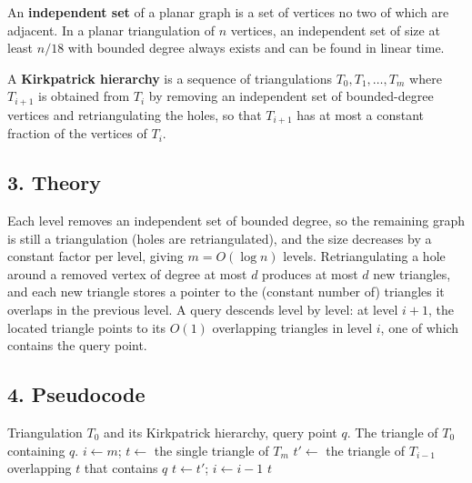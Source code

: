 \begin{definition}\label{def:pointloc_independent}
  An \textbf{independent set} of a planar graph is a set of vertices no two
  of which are adjacent. In a planar triangulation of $n$ vertices, an
  independent set of size at least $n/18$ with bounded degree always exists
  and can be found in linear time.
\end{definition}

\begin{definition}\label{def:pointloc_kh}
  A \textbf{Kirkpatrick hierarchy} is a sequence of triangulations
  $T_0, T_1, \dots, T_m$ where $T_{i+1}$ is obtained from $T_i$ by removing
  an independent set of bounded-degree vertices and retriangulating the
  holes, so that $T_{i+1}$ has at most a constant fraction of the vertices
  of $T_i$.
\end{definition}

\subsection{3. Theory}

Each level removes an independent set of bounded degree, so the remaining
graph is still a triangulation (holes are retriangulated), and the size
decreases by a constant factor per level, giving $m = O(\log n)$ levels.
Retriangulating a hole around a removed vertex of degree at most $d$
produces at most $d$ new triangles, and each new triangle stores a pointer
to the (constant number of) triangles it overlaps in the previous level.
A query descends level by level: at level $i+1$, the located triangle points
to its $O(1)$ overlapping triangles in level $i$, one of which contains the
query point.

\subsection{4. Pseudocode}

\begin{algorithm}[htbp]
\caption{Kirkpatrick Point Location}
\label{alg:pointloc_kirkpatrick}
\begin{algorithmic}[1]
\Require Triangulation $T_0$ and its Kirkpatrick hierarchy, query point $q$.
\Ensure The triangle of $T_0$ containing $q$.
  \State $i \gets m$; $t \gets$ the single triangle of $T_m$
    \State $t' \gets$ the triangle of $T_{i-1}$ overlapping $t$ that contains $q$
    \State $t \gets t'$; $i \gets i - 1$
  \EndWhile
  \State \Return $t$
\EndFunction
\end{algorithmic}
\end{algorithm}

